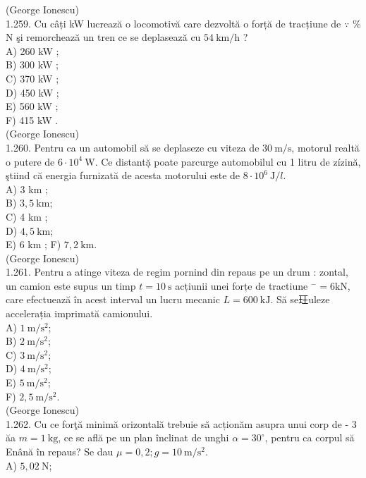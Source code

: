 {(George Ionescu)\\
1.259. Cu câți kW lucrează o locomotivă care dezvoltă o forță de tracțiune de $\because$ \% N şi remorchează un tren ce se deplasează cu $54 \mathrm{~km} / \mathrm{h}$ ?\\
A) 260 kW ;\\
B) 300 kW ;\\
C) 370 kW ;\\
D) 450 kW ;\\
E) 560 kW ;\\
F) 415 kW .\\
(George Ionescu)\\
1.260. Pentru ca un automobil să se deplaseze cu viteza de $30 \mathrm{~m} / \mathrm{s}$, motorul realtă o putere de $6 \cdot 10^{4} \mathrm{~W}$. Ce distantặ poate parcurge automobilul cu 1 litru de zízină, ştiind că energia furnizată de acesta motorului este de $8 \cdot 10^{6} \mathrm{~J} / l$.\\
A) 3 km ;\\
B) $3,5 \mathrm{~km}$;\\
C) 4 km ;\\
D) $4,5 \mathrm{~km}$;\\
E) 6 km ; F) $7,2 \mathrm{~km}$.\\
(George Ionescu)\\
1.261. Pentru a atinge viteza de regim pornind din repaus pe un drum : zontal, un camion este supus un timp $t=10 \mathrm{~s}$ acțiunii unei forțe de tractiune ${ }^{-}=6 \mathrm{kN}$, care efectuează în acest interval un lucru mecanic $L=600 \mathrm{~kJ}$. Să se玨uleze accelerația imprimată camionului.\\
A) $1 \mathrm{~m} / \mathrm{s}^{2}$;\\
B) $2 \mathrm{~m} / \mathrm{s}^{2}$;\\
C) $3 \mathrm{~m} / \mathrm{s}^{2}$;\\
D) $4 \mathrm{~m} / \mathrm{s}^{2}$;\\
E) $5 \mathrm{~m} / \mathrm{s}^{2}$;\\
F) $2,5 \mathrm{~m} / \mathrm{s}^{2}$.\\
(George Ionescu)\\
1.262. Cu ce forţă minimă orizontală trebuie să acționăm asupra unui corp de - 3 ăa $m=1 \mathrm{~kg}$, ce se află pe un plan înclinat de unghi $\alpha=30^{\circ}$, pentru ca corpul să Enână în repaus? Se dau $\mu=0,2 ; g=10 \mathrm{~m} / \mathrm{s}^{2}$.\\
A) $5,02 \mathrm{~N}$;\\
}
